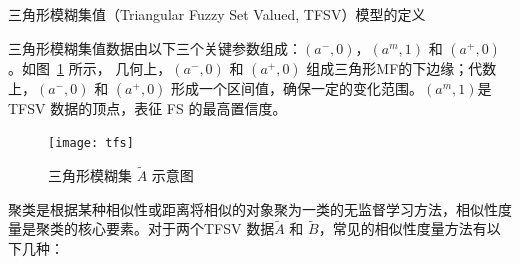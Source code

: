 \begin{definition}
    \label{define1}
    三角形模糊集值（Triangular Fuzzy Set Valued, TFSV）模型的定义
\end{definition}
三角形模糊集值数据由以下三个关键参数组成：$(a^-,0)$，$(a^m,1)$ 和 $(a^+,0)$。如图~\ref{fig:tfs} 所示，  几何上，$(a^-,0)$ 和 $(a^+,0)$ 组成三角形MF的下边缘；代数上，$(a^-,0)$ 和 $(a^+,0)$ 形成一个区间值，确保一定的变化范围。$(a^m,1)$是TFSV 数据的顶点，表征 FS 的最高置信度。
\begin{figure}[!htb]
    \centering
    \texttt{[image: tfs]}
    \caption{三角形模糊集 $\tilde{A}$ 示意图}
    \label{fig:tfs}
\end{figure}

聚类是根据某种相似性或距离将相似的对象聚为一类的无监督学习方法，相似性度量是聚类的核心要素。对于两个TFSV 数据$\tilde{A}$ 和 $\tilde{B}$，常见的相似性度量方法有以下几种：
